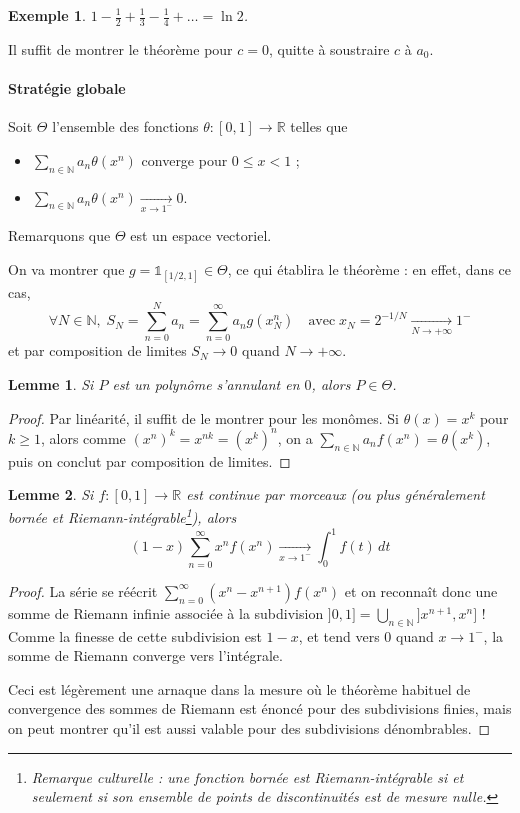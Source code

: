 \documentclass[a4paper, 11pt]{article}
\def\N{\mathbb{N}}
\def\R{\mathbb{R}}
\def\Indic{\mathbb{1}}
\newtheorem*{example}{Exemple}
\newtheorem*{lemma}{Lemme}
\begin{document}
\begin{example}
  $\displaystyle 1 - \frac{1}{2} + \frac{1}{3} - \frac{1}{4} + \ldots = \ln 2$.
\end{example}

Il suffit de montrer le théorème pour $c = 0$, quitte à soustraire $c$ à $a_0$.

\paragraph{Stratégie globale} Soit $\Theta$ l'ensemble des fonctions $\theta :
[0,1] \to \R$ telles que
\begin{itemize}
\item $\displaystyle \sum_{n \in \N} a_n \theta(x^n)$ converge pour $0 \leq x < 1$ ;
\item $\displaystyle \sum_{n \in \N} a_n \theta(x^n) \xrightarrow[x \to 1^{-}]{} 0$.
\end{itemize}
Remarquons que $\Theta$ est un espace vectoriel.

On va montrer que $g = \Indic_{[1/2, 1]} \in \Theta$, ce qui établira le
théorème : en effet, dans ce cas,
\[ \forall N \in \N,\; S_N =  \sum_{n = 0}^N a_n = \sum_{n = 0}^{\infty} a_n
  g(x_N^n) \quad \text{avec}\; x_N = 2^{-1/N} \xrightarrow[N \to +\infty]{} 1^- \]
et par composition de limites $S_N \rightarrow 0$ quand $N \to +\infty$.

\begin{lemma}
  Si $P$ est un polynôme s'annulant en $0$, alors $P \in \Theta$.
\end{lemma}
\begin{proof}
  Par linéarité, il suffit de le montrer pour les monômes. Si $\theta(x) = x^k$
  pour $k \geq 1$, alors comme $(x^n)^k = x^{nk} = (x^k)^n$, on a $\sum_{n \in
    \N} a_n f(x^n) = \theta(x^k)$, puis on conclut par composition de limites.
\end{proof}

\begin{lemma}
  Si $f : [0,1] \to \R$ est continue par morceaux (ou plus généralement bornée
  et Riemann-intégrable\footnote{Remarque culturelle : une fonction bornée est
    Riemann-intégrable si et seulement si son ensemble de points de
    discontinuités est de mesure nulle.}), alors
  \[ (1-x) \sum_{n=0}^\infty x^nf(x^n) \xrightarrow[x \to 1^{-}]{} \int_0^1
    f(t)\,dt\]
\end{lemma}
\begin{proof}
  La série se réécrit $\sum_{n=0}^\infty (x^n - x^{n+1})f(x^n)$ et on reconnaît
  donc une somme de Riemann infinie associée à la subdivision $]0,1] =
  \bigcup_{n \in \N} ]x^{n+1},x^n]$ ! Comme la finesse de cette subdivision est
  $1-x$, et tend vers $0$ quand $x \to 1^-$, la somme de Riemann converge vers
  l'intégrale.
  
  Ceci est légèrement une arnaque dans la mesure où le théorème habituel de
  convergence des sommes de Riemann est énoncé pour des subdivisions finies,
  mais on peut montrer qu'il est aussi valable pour des subdivisions
  dénombrables.
\end{proof}
\end{document}
